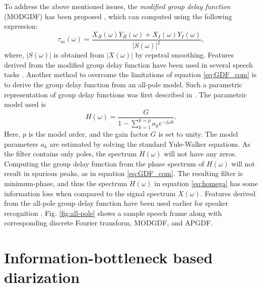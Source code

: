 \documentclass[conference]{IEEEtran}
\begin{document}
To address the above mentioned issues, the
\textit{modified group delay function} (MODGDF) has been proposed
\cite{modifiedGD}, which can
computed using the following expression:
\begin{equation}
\tau_{m}(\omega) =  
\frac{X_R(\omega)Y_R(\omega) + X_I(\omega)Y_I(\omega)}{|S(\omega)|^2}, 
\label{eq:MODGDF}
\end{equation}
where, $|S(\omega)|$ is obtained from $|X(\omega)|$ by cepstral smoothing.
Features derived from the modified group delay function have been used in
several speech tasks \cite{modifiedGD}.
Another method to overcome the limitations of equation \ref{eq:GDF_com} is to
derive the group delay function from an all-pole model. Such a parametric
representation of group delay functions was first described in \cite{yegnaJASA}.
The parametric model used is
\begin{equation}
H(\omega) =  \frac{G}{1 - \sum_{k=1}^{k = p} a_k e^{-j\omega k}}.
\label{eq:homega}
\end{equation}
Here, $p$ is the model order, and the gain factor $G$ is set to unity. The model
parameters $a_k$ are estimated by solving the standard Yule-Walker equations. As
the filter contains only poles, the spectrum $H(\omega)$ will not have any
zeros.  Computing the group delay function from the phase spectrum of
$H(\omega)$ will not result in spurious peaks, as in equation \ref{eq:GDF_com}.
The resulting filter is minimum-phase, and thus the spectrum $H(\omega)$ in
equation \ref{eq:homega} has some information loss when compared to the signal
spectrum $X(\omega)$. Features derived from the all-pole group delay function
have been used earlier for speaker recognition \cite{allPoleGdSid}. Fig. \ref{fig:all-pole} 
shows a sample speech frame along with corresponding discrete Fourier transform, MODGDF, and APGDF. 

\section{Information-bottleneck based diarization}
\label{system}

\end{document}
